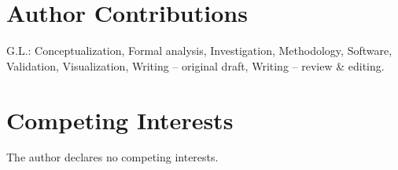 \documentclass[
    Numbered,         %
]{sn-jnl}
\begin{document}













\section*{Author Contributions}
G.L.: Conceptualization, Formal analysis, Investigation, Methodology,
Software, Validation, Visualization, Writing -- original draft,
Writing -- review \& editing.

\section*{Competing Interests}
The author declares no competing interests.






\end{document}
